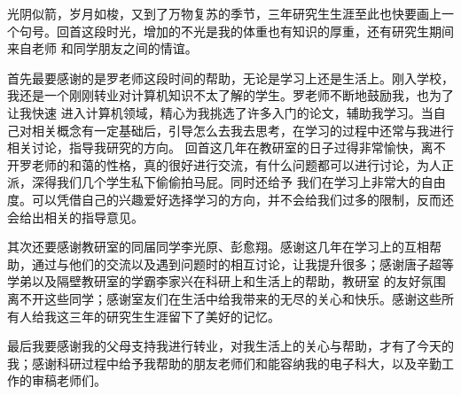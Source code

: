 
\thesisacknowledgement
光阴似箭，岁月如梭，又到了万物复苏的季节，三年研究生生涯至此也快要画上一个句号。回首这段时光，增加的不光是我的体重也有知识的厚重，还有研究生期间来自老师
和同学朋友之间的情谊。

首先最要感谢的是罗老师这段时间的帮助，无论是学习上还是生活上。刚入学校，我还是一个刚刚转业对计算机知识不太了解的学生。罗老师不断地鼓励我，也为了让我快速
进入计算机领域，精心为我挑选了许多入门的论文，辅助我学习。当自己对相关概念有一定基础后，引导怎么去我去思考，在学习的过程中还常与我进行相关讨论，指导我研究的方向。
回首这几年在教研室的日子过得非常愉快，离不开罗老师的和蔼的性格，真的很好进行交流，有什么问题都可以进行讨论，为人正派，深得我们几个学生私下偷偷拍马屁。同时还给予
我们在学习上非常大的自由度。可以凭借自己的兴趣爱好选择学习的方向，并不会给我们过多的限制，反而还会给出相关的指导意见。

其次还要感谢教研室的同届同学李光原、彭愈翔。感谢这几年在学习上的互相帮助，通过与他们的交流以及遇到问题时的相互讨论，让我提升很多；感谢唐子超等学弟以及隔壁教研室的学霸李家兴在科研上和生活上的帮助，教研室
的友好氛围离不开这些同学；感谢室友们在生活中给我带来的无尽的关心和快乐。感谢这些所有人给我这三年的研究生生涯留下了美好的记忆。

最后我要感谢我的父母支持我进行转业，对我生活上的关心与帮助，才有了今天的我；感谢科研过程中给予我帮助的朋友老师们和能容纳我的电子科大，以及辛勤工作的审稿老师们。
